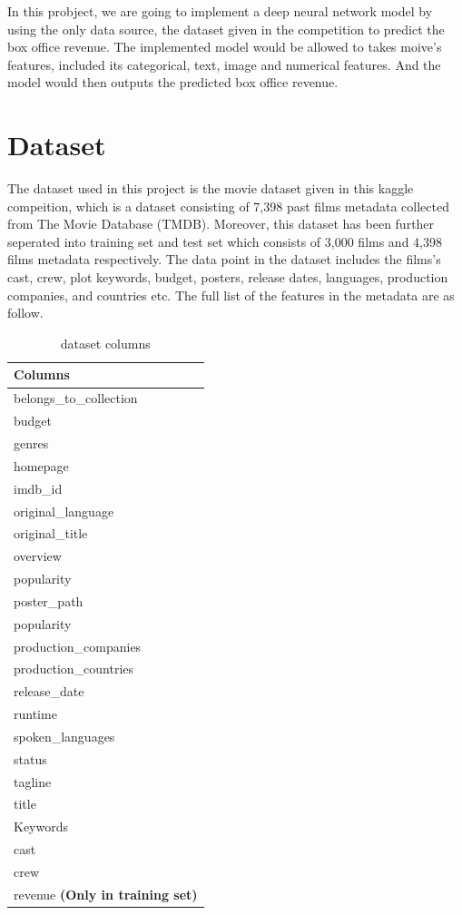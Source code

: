 \documentclass{article}
\begin{document}
In this probject, we are going to implement a deep neural network model by using the only data source, the dataset given in the competition to predict the box office revenue. The implemented model would be allowed to takes moive's features, included its categorical, text, image and numerical features. And the model would then outputs the predicted box office revenue.

\section{Dataset}

The dataset used in this project is the movie dataset given in this kaggle compeition, which is a dataset consisting of 7,398 past films metadata  collected from The Movie Database (TMDB). Moreover, this dataset has been further seperated into training set and test set which consists of 3,000 films and 4,398 films metadata respectively. The data point in the dataset includes the films's cast, crew, plot keywords, budget, posters, release dates, languages, production companies, and countries etc. The full list of the features in the metadata are as follow.

\begin{table}[htb]
	\caption{dataset columns}
	\label{sample-table}
	\centering
	\begin{tabular}{l}
		\toprule
		\cmidrule{1-1}
		Columns  \\
		\midrule
		belongs\_to\_collection \\
		budget  \\
		genres \\
		homepage  \\
		imdb\_id  \\
		original\_language \\
		original\_title	  \\
		overview  \\
		popularity  \\
		poster\_path  \\
		popularity  \\
		production\_companies \\
		production\_countries \\
		release\_date \\
		runtime \\
		spoken\_languages \\
		status \\
		tagline \\
		title \\
		Keywords \\
		cast \\
		crew \\
		revenue \textbf{(Only in training set)}\\
		\midrule
	\end{tabular}
\end{table}
\end{document}
